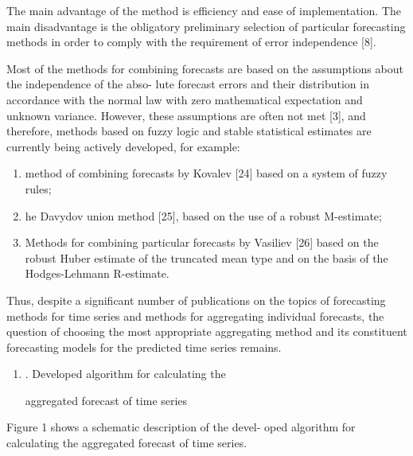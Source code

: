 \documentclass{article}
\begin{document}
\begin{multicols}{2}
\begin{enumerate}[noitemsep]
\end{enumerate}
\par The main advantage of the method is efficiency and
ease of implementation. The main disadvantage is the
obligatory preliminary selection of particular forecasting
methods in order to comply with the requirement of error
independence [8]. 
\par Most of the methods for combining forecasts are based
on the assumptions about the independence of the abso-
lute forecast errors and their distribution in accordance
with the normal law with zero mathematical expectation
and unknown variance. However, these assumptions are
often not met [3], and therefore, methods based on fuzzy 
logic and stable statistical estimates are currently being
actively developed, for example:


\columnbreak

\begin{enumerate}[noitemsep]
    \item method of combining forecasts by Kovalev [24]
based on a system of fuzzy rules;
    \item he Davydov union method [25], based on the use
of a robust M-estimate;
    \item Methods for combining particular forecasts by
Vasiliev [26] based on the robust Huber estimate
of the truncated mean type and on the basis of the
Hodges-Lehmann R-estimate.
\end{enumerate}

Thus, despite a significant number of publications
on the topics of forecasting methods for time series
and methods for aggregating individual forecasts, the
question of choosing the most appropriate aggregating
method and its constituent forecasting models for the
predicted time series remains. 
\begin{enumerate}[wide, labelindent=0pt]
\item[] . Developed algorithm for calculating the 
\centerline{aggregated
forecast of time series}
\end{enumerate}

\par Figure 1 shows a schematic description of the devel-
oped algorithm for calculating the aggregated forecast of
time series.


\end{multicols}
\end{document}
